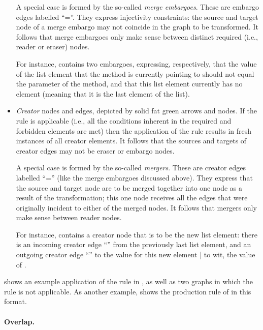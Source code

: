\begin{itemize}
  A special case is formed by the so-called \emph{merge embargoes}. These are
  embargo edges labelled ``{\sf =}''. They express injectivity constraints: the
  source and target node of a merge embargo may not coincide in the graph to be
  transformed. It follows that merge embargoes only make sense between distinct
  required (i.e., reader or eraser) nodes.
  
  For instance,  contains two embargoes, expressing,
  respectively, that the value of the list element that the \Append{} method is
  currently pointing to should not equal the \xx{} parameter of the method, and
  that this list element currently has no \Next{} element (meaning that it is
  the last element of the list).

\item \emph{Creator} nodes and edges, depicted by solid fat green arrows and
  nodes. If the rule is applicable (i.e., all the conditions inherent in the
  required and forbidden elements are met) then the application of the rule
  results in fresh instances of all creator elements.
  It follows that the sources and targets of creator edges may not be eraser or
  embargo nodes.
  
  A special case is formed by the so-called \emph{mergers}. These are creator
  edges labelled ``{\sf =}'' (like the merge embargoes discussed above). They
  express that the source and target node are to be merged together into one
  node as a result of the transformation; this one node receives all the edges
  that were originally incident to either of the merged nodes. It follows that
  mergers only make sense between reader nodes.
  
  For instance,  contains a creator node that is to be the new list
  element: there is an incoming creator edge ``\Next'' from the previously last
  list element, and an outgoing creator edge ``\Val'' to the value for this new
  element | to wit, the value of \xx{}.
\end{itemize}
%
 shows an example application of the rule in
, as well as two graphs in which the rule is not applicable.
%
%
%
As another example,  shows the production rule of
 in this format.
%

\paragraph{Overlap.}

